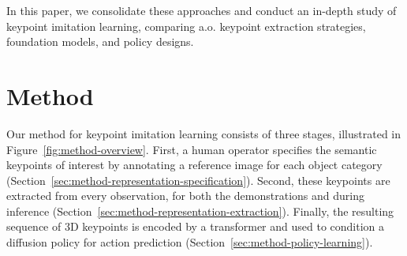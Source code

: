 \documentclass[letterpaper, 10 pt, conference]{ieeeconf}  %
\begin{document}
In this paper, we consolidate these approaches and conduct an in-depth study of keypoint imitation learning, comparing a.o. keypoint extraction strategies, foundation models, and policy designs.





\section{Method}
\label{sec:method}

Our method for keypoint imitation learning consists of three stages, illustrated in Figure~\ref{fig:method-overview}. First, a human operator specifies the semantic keypoints of interest by annotating a reference image for each object category (Section~\ref{sec:method-representation-specification}). Second, these keypoints are extracted from every observation, for both the demonstrations and during inference (Section~\ref{sec:method-representation-extraction}). Finally, the resulting sequence of $3$D keypoints is encoded by a transformer and used to condition a diffusion policy for action prediction (Section~\ref{sec:method-policy-learning}).



\end{document}
